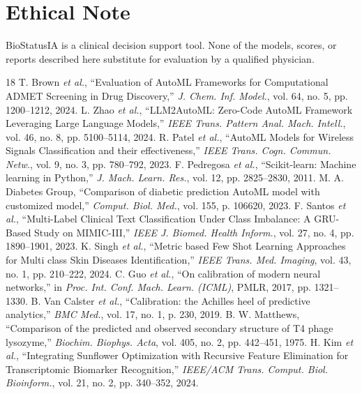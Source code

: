 \documentclass[conference]{IEEEtran}
\begin{document}
\section*{Ethical Note}
BioStatusIA is a clinical decision support tool. None of the models, scores, or reports described here substitute for evaluation by a qualified physician.

\begin{thebibliography}{18}
 T. Brown \textit{et al.}, ``Evaluation of AutoML Frameworks for Computational ADMET Screening in Drug Discovery,'' \textit{J. Chem. Inf. Model.}, vol. 64, no. 5, pp. 1200--1212, 2024.
 L. Zhao \textit{et al.}, ``LLM2AutoML: Zero-Code AutoML Framework Leveraging Large Language Models,'' \textit{IEEE Trans. Pattern Anal. Mach. Intell.}, vol. 46, no. 8, pp. 5100--5114, 2024.
 R. Patel \textit{et al.}, ``AutoML Models for Wireless Signals Classification and their effectiveness,'' \textit{IEEE Trans. Cogn. Commun. Netw.}, vol. 9, no. 3, pp. 780--792, 2023.
 F. Pedregosa \textit{et al.}, ``Scikit-learn: Machine learning in Python,'' \textit{J. Mach. Learn. Res.}, vol. 12, pp. 2825--2830, 2011.
 M. A. Diabetes Group, ``Comparison of diabetic prediction AutoML model with customized model,'' \textit{Comput. Biol. Med.}, vol. 155, p. 106620, 2023.
 F. Santos \textit{et al.}, ``Multi-Label Clinical Text Classification Under Class Imbalance: A GRU-Based Study on MIMIC-III,'' \textit{IEEE J. Biomed. Health Inform.}, vol. 27, no. 4, pp. 1890--1901, 2023.
 K. Singh \textit{et al.}, ``Metric based Few Shot Learning Approaches for Multi class Skin Diseases Identification,'' \textit{IEEE Trans. Med. Imaging}, vol. 43, no. 1, pp. 210--222, 2024.
 C. Guo \textit{et al.}, ``On calibration of modern neural networks,'' in \textit{Proc. Int. Conf. Mach. Learn. (ICML)}, PMLR, 2017, pp. 1321--1330.
 B. Van Calster \textit{et al.}, ``Calibration: the Achilles heel of predictive analytics,'' \textit{BMC Med.}, vol. 17, no. 1, p. 230, 2019.
 B. W. Matthews, ``Comparison of the predicted and observed secondary structure of T4 phage lysozyme,'' \textit{Biochim. Biophys. Acta}, vol. 405, no. 2, pp. 442--451, 1975.
 H. Kim \textit{et al.}, ``Integrating Sunflower Optimization with Recursive Feature Elimination for Transcriptomic Biomarker Recognition,'' \textit{IEEE/ACM Trans. Comput. Biol. Bioinform.}, vol. 21, no. 2, pp. 340--352, 2024.

\end{thebibliography}
\end{document}
